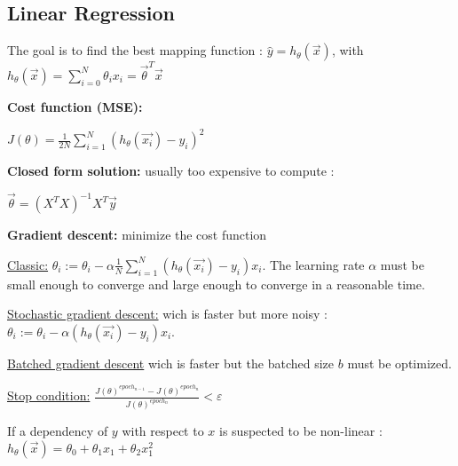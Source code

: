 \subsection*{Linear Regression}
The goal is to find the best mapping function : $\hat{y}=h_\theta(\overrightarrow{x})$, with $h_\theta(\overrightarrow{x})=\sum_{i=0}^{N}\theta_ix_i=\overrightarrow{\theta}^T\overrightarrow{x}$

\textbf{Cost function (MSE):}

$J(\theta)=\frac{1}{2N}\sum_{i=1}^{N}(h_\theta(\overrightarrow{x_i})-y_i)^2$

\textbf{Closed form solution:} usually too expensive to compute :

$\overrightarrow{\theta}=(X^TX)^{-1}X^T\overrightarrow{y}$

\textbf{Gradient descent:} minimize the cost function

\underline{Classic:} $\theta_i:=\theta_i-\alpha\frac{1}{N}\sum_{i=1}^{N}(h_\theta(\overrightarrow{x_i})-y_i)x_i$.
The learning rate $\alpha$ must be small enough to converge and large enough to converge in a reasonable time.

\underline{Stochastic gradient descent:} wich is faster but more noisy : $\theta_i:=\theta_i-\alpha(h_\theta(\overrightarrow{x_i})-y_i)x_i$.

\underline{Batched gradient descent} wich is faster but the batched size $b$ must
be optimized.

\underline{Stop condition:} $\frac{J(\theta)^{epoch_{n-1}}-J(\theta)^{epoch_{n}}}{J(\theta)^{epoch_{n}}}<\varepsilon$

If a dependency of $y$ with respect to $x$ is suspected to be non-linear :
$h_\theta(\overrightarrow{x})=\theta_0+\theta_1x_1+\theta_2x_1^2$